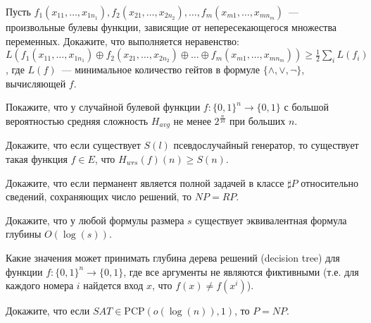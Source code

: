 \setcounter{curtask}{21}



\begin{task}
    Пусть $f_1(x_{1 1}, \dots, x_{1 n_1}), f_2(x_{2 1}, \dots, x_{2 n_2}), \dots, f_m(x_{m 1}, \dots, x_{m n_m})$~--- произвольные
    булевы функции, зависящие от непересекающегося множества переменных. Докажите, что выполняется неравенство:\\
    $L(f_1(x_{1 1}, \dots, x_{1 n_1}) \oplus f_2(x_{2 1}, \dots, x_{2 n_2}) \oplus \dots \oplus f_m(x_{m 1}, \dots, x_{m n_m}))
    \ge \frac{1}{2} \sum\limits_{i} L(f_i)$, где $L(f)$~--- минимальное количество гейтов в формуле $\{\land, \lor, \neg\}$,
    вычисляющей $f$.
\end{task}

\begin{task}
    Покажите, что у случайной булевой функции $f: \{0, 1\}^n \rightarrow \{0, 1\}$ с большой вероятностью средняя сложность
    $H_{avg}$ не менее $2^{\frac{n}{10}}$ при больших $n$.
\end{task}

\begin{task}
    Докажите, что если существует $S(l)$ псевдослучайный генератор, то существует такая функция $f \in E$, что $H_{wrs}(f)(n) \ge
    S(n)$.
\end{task}

\begin{task}
    Докажите, что если перманент является полной задачей в классе $\sharp P$ относительно сведений, сохраняющих число
    решений, то $NP = RP$.
\end{task}


\breakline


\begin{ptask}{9}
    Докажите, что у любой формулы размера $s$ существует эквивалентная формула глубины $O(\log(s))$.
\end{ptask}

\begin{ptask}{10}
    Какие значения может принимать глубина дерева решений (decision tree) для функции $f: \{0, 1\}^n \rightarrow \{0, 1\}$, где
    все аргументы не являются фиктивными (т.е. для каждого номера $i$ найдется вход $x$, что $f(x) \neq f(x^{i})$).
\end{ptask}

\begin{ptask}{14}
    Докажите, что если $SAT \in \mathrm{PCP}(o(\log(n)), 1)$, то $P = NP$.
\end{ptask}

